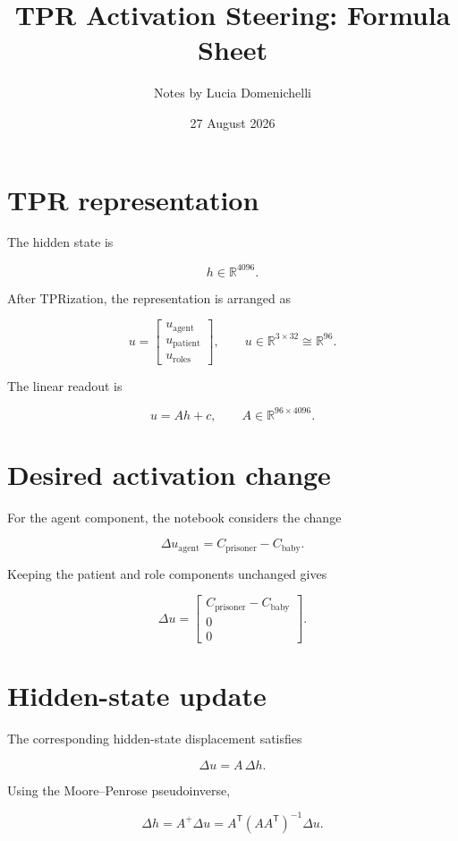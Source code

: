\documentclass[11pt,a4paper]{article}
\title{TPR Activation Steering: Formula Sheet}
\author{Notes by Lucia Domenichelli}
\date{27 August 2026}
\newcommand{\R}{\mathbb{R}}
\begin{document}
\maketitle

\section*{TPR representation}

The hidden state is

\[
  h \in \R^{4096}.
\]

After TPRization, the representation is arranged as

\[
  u
  =
  \begin{bmatrix}
    u_{\mathrm{agent}} \\
    u_{\mathrm{patient}} \\
    u_{\mathrm{roles}}
  \end{bmatrix},
  \qquad
  u \in \R^{3 \times 32} \cong \R^{96}.
\]

The linear readout is

\[
  u = Ah + c,
  \qquad
  A \in \R^{96 \times 4096}.
\]

\section*{Desired activation change}

For the agent component, the notebook considers the change

\[
  \Delta u_{\mathrm{agent}}
  = C_{\mathrm{prisoner}} - C_{\mathrm{baby}}.
\]

Keeping the patient and role components unchanged gives

\[
  \Delta u
  =
  \begin{bmatrix}
    C_{\mathrm{prisoner}} - C_{\mathrm{baby}} \\
    0 \\
    0
  \end{bmatrix}.
\]

\section*{Hidden-state update}

The corresponding hidden-state displacement satisfies

\[
  \Delta u = A\,\Delta h.
\]

Using the Moore--Penrose pseudoinverse,

\[
  \Delta h
  = A^{+}\Delta u
  = A^{\mathsf T}\!\left(AA^{\mathsf T}\right)^{-1}\Delta u.
\]
\end{document}
